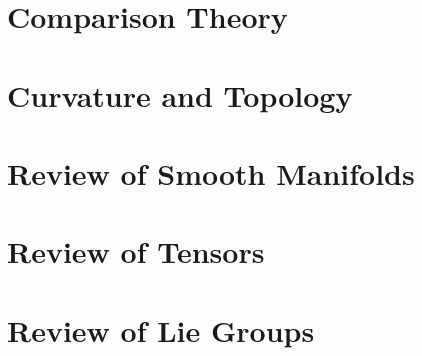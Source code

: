 \chapter{Comparison Theory}
\label{chap:comparison-theory}


\chapter{Curvature and Topology}
\label{chap:curvature-and-topology}


\appendix

\chapter{Review of Smooth Manifolds}
\label{chap:review-smooth-manifolds}


\chapter{Review of Tensors}
\label{chap:review-tensors}


\chapter{Review of Lie Groups}
\label{chap:review-lie-groups}

